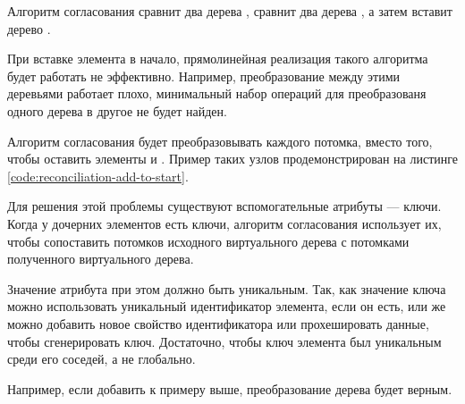 
Алгоритм согласования сравнит два дерева , сравнит два дерева , а затем вставит дерево . 

При вставке элемента в начало, прямолинейная реализация такого алгоритма будет работать не эффективно. Например, преобразование между этими деревьями работает плохо, минимальный набор операций для преобразованя одного дерева в другое не будет найден.

Алгоритм согласования будет преобразовывать каждого потомка, вместо того, чтобы оставить элементы  и \linebreak
{}. Пример таких узлов продемонстрирован на листинге \ref{code:reconciliation-add-to-start}.

\clearpage


Для решения этой проблемы существуют вспомогательные атрибуты  --- ключи. Когда у дочерних элементов есть ключи, алгоритм согласования использует их, чтобы сопоставить потомков исходного виртуального дерева с потомками полученного виртуального дерева.

Значение атрибута  при этом должно быть уникальным.
Так, как значение ключа  можно использовать уникальный идентификатор элемента, если он есть, или же можно добавить новое свойство идентификатора или прохешировать данные, чтобы сгенерировать ключ. 
Достаточно, чтобы ключ элемента был уникальным среди его соседей, а не глобально.

Например, если добавить  к примеру выше, преобразование дерева будет верным.
\clearpage

